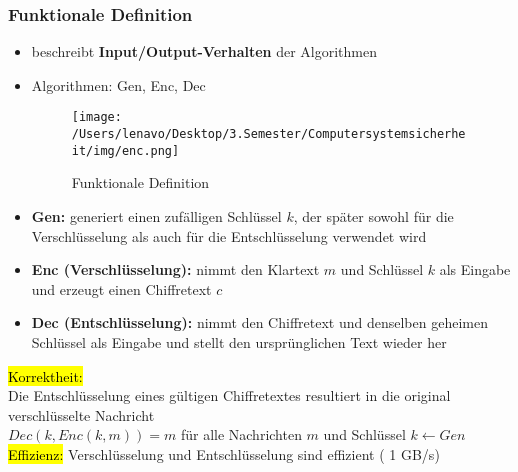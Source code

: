 \documentclass[a4paper, 10pt]{article}
\begin{document}
\subsubsection{Funktionale Definition}
\begin{itemize}
    \item beschreibt \textbf{Input/Output-Verhalten} der Algorithmen
    \item Algorithmen: Gen, Enc, Dec
    \begin{figure}[h]
        \centering
        \texttt{[image: /Users/lenavo/Desktop/3.Semester/Computersystemsicherheit/img/enc.png]}
        \caption{Funktionale Definition}
        \label{fig:enter-label}
    \end{figure}

    \item \textbf{Gen:} generiert einen zufälligen Schlüssel $k$, der später sowohl für die Verschlüsselung als auch für die Entschlüsselung verwendet wird
    \item \textbf{Enc (Verschlüsselung):} nimmt den Klartext $m$ und Schlüssel $k$ als Eingabe und erzeugt einen Chiffretext $c$
    \item \textbf{Dec (Entschlüsselung):} nimmt den Chiffretext und denselben geheimen Schlüssel als Eingabe und stellt den ursprünglichen Text wieder her
\end{itemize}
\hl{Korrektheit:}\\
Die Entschlüsselung eines gültigen Chiffretextes resultiert in die original verschlüsselte Nachricht\\[3mm]
$Dec (k,Enc(k,m)) = m$ für alle Nachrichten $m$ und Schlüssel $k \longleftarrow Gen$\\[3mm]
\hl{Effizienz:} Verschlüsselung und Entschlüsselung sind effizient ( 1 GB/s)
\end{document}
